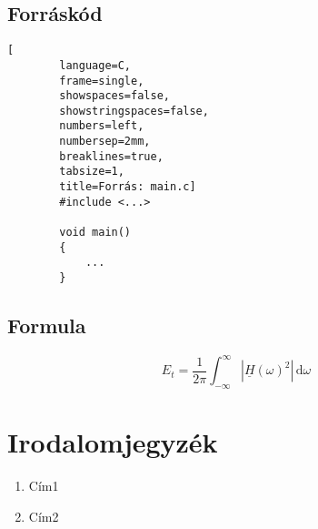 \documentclass[oneside,a4paper,12pt]{article}
\begin{document}
	\subsection{Forráskód}
	
	\begin{lstlisting}[
		language=C,
		frame=single,
		showspaces=false,
		showstringspaces=false,
		numbers=left,
		numbersep=2mm,
		breaklines=true,
		tabsize=1,
		title=Forrás: main.c]
		#include <...>
		
		void main()
		{
			...
		}
	\end{lstlisting}
	
	\subsection{Formula}
	
	$$ E_t = \dfrac{1}{2\pi} \int_{-\infty}^{\infty} |\underline{H}(\omega)^2|\, \mathrm{d}\omega $$
	
	\bigskip
	
	\pagebreak
	\section{Irodalomjegyzék}
	
	\begin{enumerate}
		\item Cím1
		\item Cím2
	\end{enumerate}
	
\end{document}
